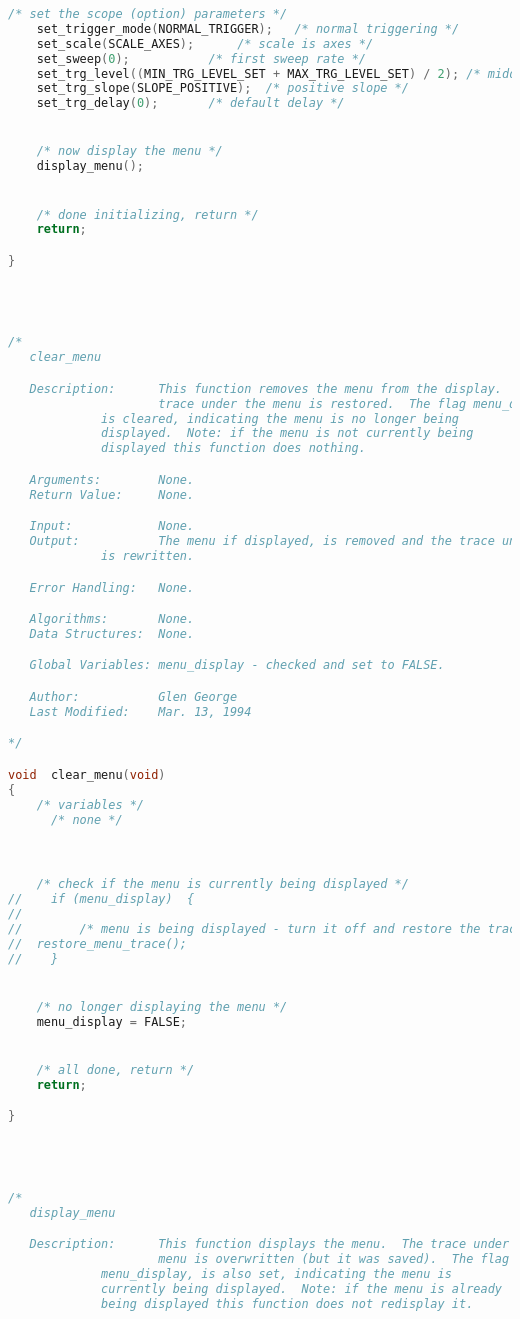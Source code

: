 \begin{lstlisting}[language=C]
    /* set the scope (option) parameters */
    set_trigger_mode(NORMAL_TRIGGER);	/* normal triggering */
    set_scale(SCALE_AXES);		/* scale is axes */
    set_sweep(0);			/* first sweep rate */
    set_trg_level((MIN_TRG_LEVEL_SET + MAX_TRG_LEVEL_SET) / 2);	/* middle trigger level */
    set_trg_slope(SLOPE_POSITIVE);	/* positive slope */
    set_trg_delay(0);		/* default delay */


    /* now display the menu */
    display_menu();


    /* done initializing, return */
    return;

}




/*
   clear_menu

   Description:      This function removes the menu from the display.  The
                     trace under the menu is restored.  The flag menu_display,
		     is cleared, indicating the menu is no longer being
		     displayed.  Note: if the menu is not currently being
		     displayed this function does nothing.

   Arguments:        None.
   Return Value:     None.

   Input:            None.
   Output:           The menu if displayed, is removed and the trace under it
   		     is rewritten.

   Error Handling:   None.

   Algorithms:       None.
   Data Structures:  None.

   Global Variables: menu_display - checked and set to FALSE.

   Author:           Glen George
   Last Modified:    Mar. 13, 1994

*/

void  clear_menu(void)
{
    /* variables */
      /* none */



    /* check if the menu is currently being displayed */
//    if (menu_display)  {
//
//        /* menu is being displayed - turn it off and restore the trace in that area */
//	restore_menu_trace();
//    }


    /* no longer displaying the menu */
    menu_display = FALSE;


    /* all done, return */
    return;

}




/*
   display_menu

   Description:      This function displays the menu.  The trace under the
                     menu is overwritten (but it was saved).  The flag
		     menu_display, is also set, indicating the menu is
		     currently being displayed.  Note: if the menu is already
		     being displayed this function does not redisplay it.


\end{lstlisting}
